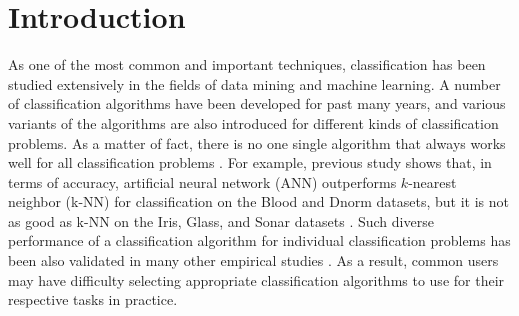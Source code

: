 \documentclass[acmsmall]{acmart}
\begin{document}
\section{Introduction}\label{sec:intro}
As one of the most common and important techniques, classification has been studied extensively in the fields of data mining and machine learning.
A number of classification algorithms have been developed for past many years,
and various variants of the algorithms are also introduced for different kinds of classification problems.
As a matter of fact, there is no one single algorithm that always works well for all classification problems \cite{song2012automatic}.
For example, previous study shows that, in terms of accuracy,
artificial neural network (ANN) outperforms $k$-nearest neighbor (k-NN) for classification on the Blood and Dnorm datasets,
but it is not as good as k-NN on the Iris, Glass, and Sonar datasets \cite{duin1996note}.
Such diverse performance of a classification algorithm for individual classification problems has been also validated in many other empirical studies \cite{brazdil2003ranking,Bensusan1998god,ali2006learning,smith2008cross,song2012automatic,prudencio2011selecting}.
As a result, common users may have difficulty selecting appropriate classification algorithms to use for their respective tasks in practice.



\end{document}
